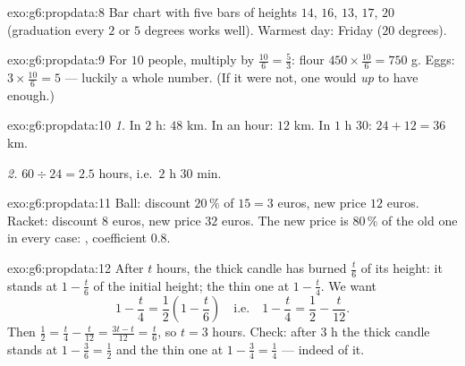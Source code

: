 \begin{solution}{exo:g6:propdata:8}
Bar chart with five bars of heights $14$, $16$, $13$, $17$, $20$
(graduation every $2$ or $5$ degrees works well). Warmest day: Friday
($20$ degrees).
\end{solution}

\begin{solution}{exo:g6:propdata:9}
For $10$ people, multiply by $\frac{10}{6} = \frac53$: flour
$450 \times \frac{10}{6} = 750$ g. Eggs:
$3 \times \frac{10}{6} = 5$ --- luckily a whole number. (If it were
not, one would  \emph{up} to have enough.)
\end{solution}

\begin{solution}{exo:g6:propdata:10}
\emph{1.} In $2$ h: $48$ km. In  an hour: $12$ km. In
$1$ h $30$: $24 + 12 = 36$ km.

\emph{2.} $60 \div 24 = 2.5$ hours, i.e.\ $2$ h $30$ min.
\end{solution}

\begin{solution}{exo:g6:propdata:11}
Ball: discount $20\,\%$ of $15 = 3$ euros, new price $12$ euros.
Racket: discount $8$ euros, new price $32$ euros. The new price is
$80\,\%$ of the old one in every case: , coefficient
$0.8$.
\end{solution}

\begin{solution}{exo:g6:propdata:12}
After $t$ hours, the thick candle has burned $\frac t6$ of its height:
it stands at $1 - \frac t6$ of the initial height; the thin one at
$1 - \frac t4$. We want
\[
1 - \frac t4 = \frac12 \left(1 - \frac t6\right)
\quad\text{i.e.}\quad
1 - \frac t4 = \frac12 - \frac t{12}.
\]
Then $\frac12 = \frac t4 - \frac t{12} = \frac{3t - t}{12} =
\frac{t}{6}$, so $t = 3$ hours. Check: after $3$ h the thick candle
stands at $1 - \frac36 = \frac12$ and the thin one at
$1 - \frac34 = \frac14$ --- indeed  of it.
\end{solution}

